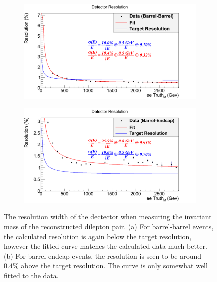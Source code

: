 \documentclass{article}
\begin{document}
\begin{figure}[h]
    \centering
    \begin{subfigure}{.49\textwidth}
        \includegraphics[height=0.6\textwidth]{images/resolution/barrelBarrel.png}
        \caption{}
        \label{fig:bbRes}
    \end{subfigure}
    \begin{subfigure}{.49\textwidth}
        \includegraphics[height=0.6\textwidth]{images/resolution/barrelEndcap.png}
        \caption{}
        \label{fig:beRes}
    \end{subfigure}
    \caption{ 
The resolution width of the dectector when measuring the invariant mass of the reconstructed dilepton pair. (a) For barrel-barrel events, the calculated resolution is again below the target resolution, however the fitted curve matches the calculated data much better. (b) For barrel-endcap events, the resolution is seen to be around $0.4\%$ above the target resolution. The curve is only somewhat well fitted to the data.\label{fig:resolution}}    
\end{figure}
\end{document}
